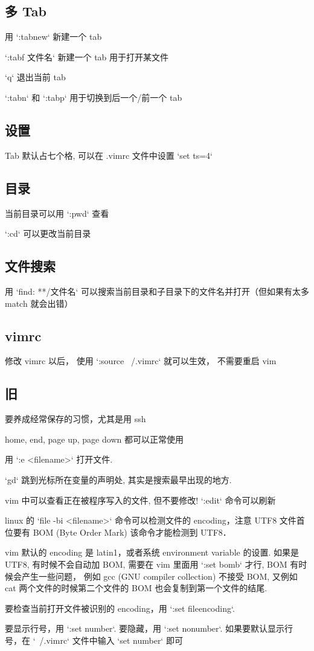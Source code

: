 \subsection{多 Tab}
\item 用 `:tabnew` 新建一个 tab
\item `:tabf 文件名` 新建一个 tab 用于打开某文件
\item `q` 退出当前 tab
\item `:tabn` 和 `:tabp` 用于切换到后一个/前一个 tab

\subsection{设置}
\item Tab 默认占七个格, 可以在 .vimrc 文件中设置 `set ts=4`

\subsection{目录}
\item 当前目录可以用 `:pwd` 查看
\item `:cd` 可以更改当前目录

\subsection{文件搜索}
\item 用 `find: **/文件名` 可以搜索当前目录和子目录下的文件名并打开（但如果有太多 match 就会出错）

\subsection{vimrc}
\item 修改 vimrc 以后， 使用 `:source ~/.vimrc` 就可以生效， 不需要重启 vim

\subsection{旧}
\item 要养成经常保存的习惯，尤其是用 ssh
\item home, end, page up, page down 都可以正常使用
\item 用 `:e <filename>` 打开文件.
\item `gd` 跳到光标所在变量的声明处, 其实是搜索最早出现的地方.
\item vim 中可以查看正在被程序写入的文件, 但不要修改! `:edit` 命令可以刷新
\item linux 的 `file -bi <filename>` 命令可以检测文件的 encoding，注意 UTF8 文件首位要有 BOM (Byte Order Mark) 该命令才能检测到 UTF8．
\item vim 默认的 encoding 是 latin1，或者系统 environment variable 的设置. 如果是 UTF8, 有时候不会自动加 BOM, 需要在 vim 里面用 `:set bomb` 才行, BOM 有时候会产生一些问题， 例如 gcc (GNU compiler collection) 不接受 BOM, 又例如 cat 两个文件的时候第二个文件的 BOM 也会复制到第一个文件的结尾.
\item 要检查当前打开文件被识别的 encoding，用 `:set fileencoding`.
\item 要显示行号，用 `:set number`. 要隐藏，用 `:set nonumber`. 如果要默认显示行号，在 `~/.vimrc` 文件中输入 `set number` 即可

